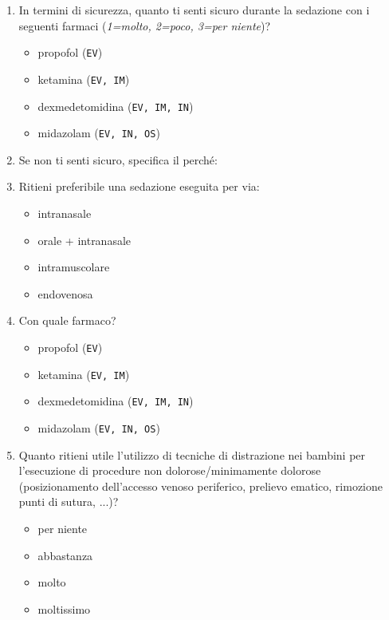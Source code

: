 \begin{enumerate}
           \item In termini di sicurezza, quanto ti senti sicuro durante la sedazione con i seguenti farmaci (\emph{1=molto, 2=poco, 3=per niente})?
           \begin{itemize}
               \item propofol (\texttt{EV})
               \item ketamina (\texttt{EV, IM})
               \item dexmedetomidina (\texttt{EV, IM, IN})
               \item midazolam (\texttt{EV, IN, OS})
           \end{itemize}
           
           \item Se non ti senti sicuro, specifica il perché:
           \item Ritieni preferibile una sedazione eseguita per via:
           \begin{itemize}
               \item intranasale
               \item orale + intranasale
               \item intramuscolare
               \item endovenosa
           \end{itemize}
           
           \item Con quale farmaco?
            \begin{itemize}
               \item propofol (\texttt{EV})
               \item ketamina (\texttt{EV, IM})
               \item dexmedetomidina (\texttt{EV, IM, IN})
               \item midazolam (\texttt{EV, IN, OS})
           \end{itemize}
           
           \item Quanto ritieni utile l’utilizzo di tecniche di distrazione nei bambini per l’esecuzione di procedure non dolorose/minimamente dolorose (posizionamento dell'accesso venoso periferico, prelievo ematico, rimozione punti di sutura, ...)?
           \begin{itemize}
               \item per niente
               \item abbastanza
               \item molto
               \item moltissimo
           \end{itemize}
           

\end{enumerate}
